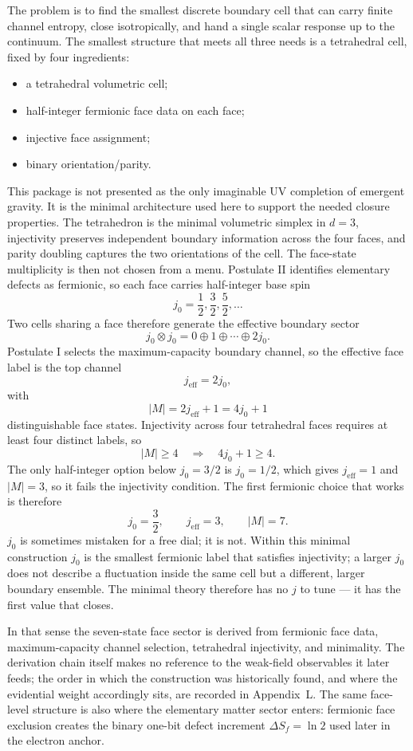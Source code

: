 \documentclass[11pt]{article}
\begin{document}
The problem is to find the smallest discrete boundary cell that can carry finite channel entropy, close isotropically, and hand a single scalar response up to the continuum. The smallest structure that meets all three needs is a tetrahedral cell, fixed by four ingredients:
\begin{itemize}
\item a tetrahedral volumetric cell;
\item half-integer fermionic face data on each face;
\item injective face assignment;
\item binary orientation/parity.
\end{itemize}
This package is not presented as the only imaginable UV completion of emergent gravity. It is the minimal architecture used here to support the needed closure properties. The tetrahedron is the minimal volumetric simplex in $d=3$, injectivity preserves independent boundary information across the four faces, and parity doubling captures the two orientations of the cell. The face-state multiplicity is then not chosen from a menu. Postulate II identifies elementary defects as fermionic, so each face carries half-integer base spin
\[
j_0=\frac12,\frac32,\frac52,\ldots
\]
Two cells sharing a face therefore generate the effective boundary sector
\[
j_0\otimes j_0 = 0\oplus 1\oplus \cdots \oplus 2j_0.
\]
Postulate I selects the maximum-capacity boundary channel, so the effective face label is the top channel
\[
j_{\mathrm{eff}}=2j_0,
\]
with
\[
|M|=2j_{\mathrm{eff}}+1=4j_0+1
\]
distinguishable face states. Injectivity across four tetrahedral faces requires at least four distinct labels, so
\[
|M|\ge 4 \quad\Longrightarrow\quad 4j_0+1\ge 4.
\]
The only half-integer option below $j_0=3/2$ is $j_0=1/2$, which gives $j_{\mathrm{eff}}=1$ and $|M|=3$, so it fails the injectivity condition. The first fermionic choice that works is therefore
\[
j_0=\frac32,
\qquad
j_{\mathrm{eff}}=3,
\qquad
|M|=7.
\]
$j_0$ is sometimes mistaken for a free dial; it is not. Within this minimal construction $j_0$ is the smallest fermionic label that satisfies injectivity; a larger $j_0$ does not describe a fluctuation inside the same cell but a different, larger boundary ensemble. The minimal theory therefore has no $j$ to tune --- it has the first value that closes.

In that sense the seven-state face sector is derived from fermionic face data, maximum-capacity channel selection, tetrahedral injectivity, and minimality. The derivation chain itself makes no reference to the weak-field observables it later feeds; the order in which the construction was historically found, and where the evidential weight accordingly sits, are recorded in Appendix~L. The same face-level structure is also where the elementary matter sector enters: fermionic face exclusion creates the binary one-bit defect increment $\Delta S_f=\ln 2$ used later in the electron anchor.
\end{document}
